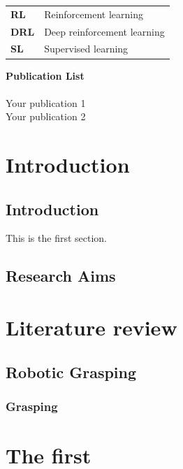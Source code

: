 \documentclass[hidelinks, a4paper, 14pt]{extreport}
\begin{document}
\begin{tabular}{ll}
{\bf RL}    & Reinforcement learning\\
{\bf DRL}   & Deep reinforcement learning\\
{\bf SL}    & Supervised learning\\
\end{tabular}

\newpage
{}
{\large \bf \noindent Publication List}\\ \\

\noindent [1] Your publication 1\\
\noindent [2] Your publication 2\\

\chapter{Introduction}
\setcounter{page}{1}

\newpage
\section{Introduction}
   
This is the first section.
\section{Research Aims}

\chapter{Literature review}

\newpage
\section{Robotic Grasping}
\subsection{Grasping}

\chapter{The first}
\end{document}
